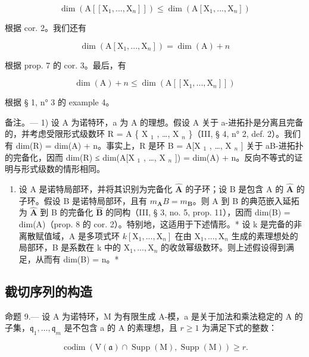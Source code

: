 \[
\dim (\mathrm{A} [ [ \mathrm{X} _ {1},..., \mathrm{X} _ {n} ] ]) \leqslant \dim (\mathrm{A} [ \mathrm{X} _ {1},..., \mathrm{X} _ {n} ])
\]

根据 cor. 2。我们还有

\[
\dim (\mathrm{A} [ \mathrm{X} _ {1},..., \mathrm{X} _ {n} ]) = \dim (\mathrm{A}) + n
\]

根据 prop. 7 的 cor. 3。最后，有

\[
\dim (\mathrm{A}) + n \leqslant \dim (\mathrm{A} [ [ \mathrm{X} _ {1},..., \mathrm{X} _ {n} ] ])
\]

根据 § 1, n° 3 的 example 4。

备注。--- 1) 设 A 为诺特环，a 为 A 的理想。假设 A 关于 a-进拓扑是分离且完备的，并考虑受限形式级数环 R = A \{ X \(_{1}\) , \ldots, X \(_{n}\) \}（III, § 4, n° 2, def. 2）。我们有 dim(R) = dim(A) + n。事实上，R 是环 B = A{[}X \(_{1}\) , \ldots, X \(_{n}\) {]} 关于 aB-进拓扑的完备化，因而 dim(R) ≤ dim(A{[}X \(_{1}\) , \ldots, X \(_{n}\) {]}) = dim(A) + n。反向不等式的证明与形式级数的情形相同。

\begin{enumerate}
\def\labelenumi{\arabic{enumi})}
\setcounter{enumi}{1}
\tightlist
\item
  设 A 是诺特局部环，并将其识别为完备化 \(\hat{\mathbf{A}}\) 的子环；设 B 是包含 A 的 \(\hat{\mathbf{A}}\) 的子环。假设 B 是诺特局部环，且有 \(m_{\mathbf{A}}B = m_{\mathbf{B}}\)。则 A 到 B 的典范嵌入延拓为 \(\hat{\mathbf{A}}\) 到 B 的完备化 \(\hat{\mathbf{B}}\) 的同构（III, § 3, no. 5, prop. 11），因而 dim(B) = dim(A)（prop. 8 的 cor. 2）。特别地，这适用于下述情形。* 设 k 是完备的非离散赋值域，A 是多项式环 \(k[\mathrm{X}_1, ..., \mathrm{X}_n]\) 在由 \(\mathrm{X}_1, ..., \mathrm{X}_n\) 生成的素理想处的局部环，B 是系数在 k 中的 \(\mathrm{X}_1, ..., \mathrm{X}_n\) 的收敛幂级数环。则上述假设得到满足，从而有 dim(B) = n。*
\end{enumerate}

\subsection{截切序列的构造}

命题 9.--- 设 A 为诺特环，M 为有限生成 A-模，a 是关于加法和乘法稳定的 A 的子集，\(\mathfrak{q}_{1},\ldots,\mathfrak{q}_{m}\) 是不包含 a 的 A 的素理想，且 \(r\geqslant1\) 为满足下式的整数：

\[
\operatorname{codim} (\mathrm{V} (\mathfrak {a}) \cap \operatorname{Supp} (\mathrm{M}), \operatorname{Supp} (\mathrm{M})) \geqslant r.\tag{21}
\]

